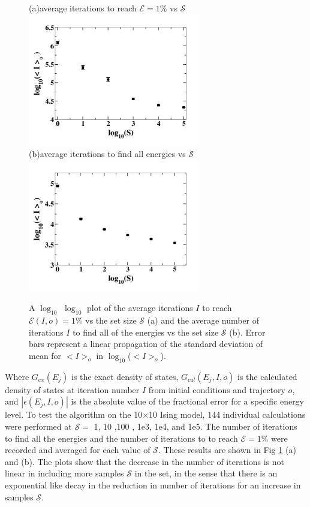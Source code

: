\documentclass[aps,prl,reprint,superscriptaddress,showkeys]{revtex4-1}
\begin{document}
\begin{figure}[h!]
(a)\hspace{0.1cm}average iterations to reach $\mathcal{E}=1\%$ vs $\mathcal{S}$\\
\includegraphics[width=7.5cm]{its_vs_S.png}\\
(b)\hspace{0.1cm}average iterations to find all energies vs $\mathcal{S}$\\
\includegraphics[width=7.5cm]{its_to_find.png}
\caption{\label{its_to}A $\log_{10}$ $\log_{10}$  plot of the average iterations $I$ to reach $\mathcal{E}(I,o)=1\%$ vs the set size $\mathcal{S}$ (a) and the average number of iterations $I$ to find all of the energies vs the set size $\mathcal{S}$ (b). Error bars represent a linear propagation of the standard deviation of mean for $<I>_o$ in $\log_{10}$($<I>_o$). }
\end{figure}
Where $G_{ex}(E_j)$ is the exact density of states, $G_{cal}(E_j,I,o)$ is the calculated density of states  at iteration number $I$ from initial conditions and trajectory $o$, and $|\epsilon(E_j,I,o)|$ is the absolute value of the fractional error for a specific energy level. To test the algorithm on the 10$\times$10 Ising model, 144 individual calculations were performed at  $\mathcal{S}=$ 1, 10 ,100 , 1e3,  1e4, and 1e5. The number of iterations to find all the energies and the number of iterations to to reach $\mathcal{E}=1\%$ were recorded and averaged for each value of $\mathcal{S}$. These results are shown in Fig \ref{its_to}  (a) and (b).  The plots show that the decrease in the number of iterations is not linear in including more samples $\mathcal{S}$ in the set, in the sense that there is an exponential like decay in the reduction in number of  iterations for an increase in samples $\mathcal{S}$.  
\end{document}
